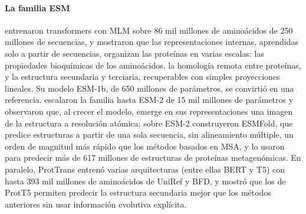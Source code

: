\paragraph{La familia ESM} \textcite{c17-rives2021} entrenaron transformers con MLM sobre 86 mil millones de aminoácidos de 250 millones de secuencias, y mostraron que las representaciones internas, aprendidas solo a partir de secuencias, organizan las proteínas en varias escalas: las propiedades bioquímicas de los aminoácidos, la homología remota entre proteínas, y la estructura secundaria y terciaria, recuperables con simples proyecciones lineales. Su modelo ESM-1b, de 650 millones de parámetros, se convirtió en una referencia. \textcite{c17-lin2023} escalaron la familia hasta ESM-2 de 15 mil millones de parámetros y observaron que, al crecer el modelo, emerge en sus representaciones una imagen de la estructura a resolución atómica; sobre ESM-2 construyeron ESMFold, que predice estructuras a partir de una sola secuencia, sin alineamiento múltiple, un orden de magnitud más rápido que los métodos basados en MSA, y lo usaron para predecir más de 617 millones de estructuras de proteínas metagenómicas. En paralelo, ProtTrans \parencite{c17-elnaggar2022} entrenó varias arquitecturas (entre ellas BERT y T5) con hasta 393 mil millones de aminoácidos de UniRef y BFD, y mostró que los  de ProtT5 permiten predecir la estructura secundaria mejor que los métodos anteriores sin usar información evolutiva explícita.

